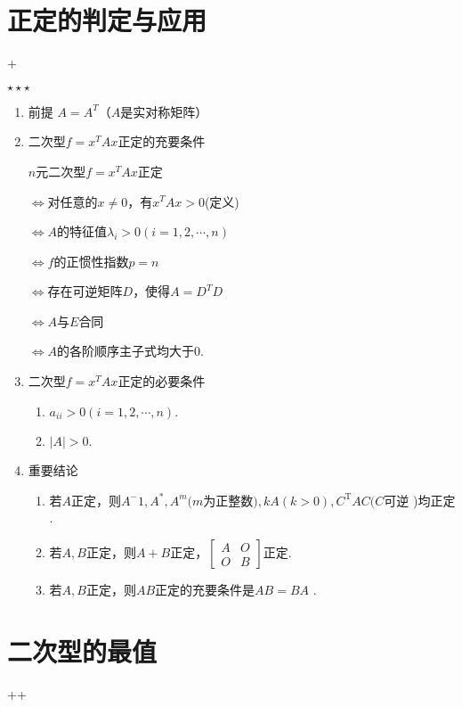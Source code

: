 \section{正定的判定与应用}
\DOne+\DTwoThree

$\star\star\star$

\begin{enumerate}
    \item 前提
          $A=A^T$（$A$是实对称矩阵）
    \item 二次型$f=x^TAx$正定的充要条件 \DTwo

          $n$元二次型$f=x^{T}Ax$正定

          $\Leftrightarrow$对任意的$x\neq 0$，有$x^{T}Ax>0$(定义)

          $\Leftrightarrow A$的特征值$\lambda_{i}>0(i=1,2,\cdots,n)$

          $\Leftrightarrow f$的正惯性指数$p=n$

          $\Leftrightarrow$存在可逆矩阵$D$，使得$A=D^{T}D$

          $\Leftrightarrow A$与$E$合同

          $\Leftrightarrow A$的各阶顺序主子式均大于0.
    \item 二次型$f=x^TAx$正定的必要条件
          \begin{enumerate}
              \item $a_{ii}>0\left(i=1,2,\cdots,n\right).$
              \item $| A| > 0$.
          \end{enumerate}
    \item 重要结论
          \begin{enumerate}
              \item 若$A$正定，则$A^-1,A^{*},A^{m}(m$为正整数$),kA(k>0),C^{\mathrm{T}}AC(C$可逆 )均正定 .

              \item 若$A,B$正定，则$A+B$正定，$\begin{bmatrix}A&O\\O&B\end{bmatrix}$正定.

              \item ${\text{若}A,B}$正定，则$AB$正定的充要条件是$AB= BA$ .
          \end{enumerate}

\end{enumerate}

\section{二次型的最值}
\DOne+\DTwoTwo+\DTwoThree



